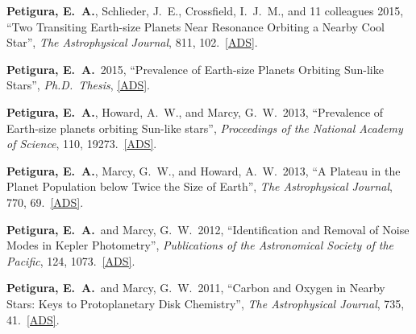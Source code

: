 \item {\bf {\bf Petigura, E.}~A.}, Schlieder, J.~E., Crossfield, I.~J.~M., and 11 
colleagues 2015,  ``Two Transiting Earth-size Planets Near Resonance 
Orbiting a Nearby Cool Star'', {\it The Astrophysical Journal}, 811,  102.\  
\href{http://adsabs.harvard.edu/abs/2015ApJ...811..102P}{[ADS]}. 


\item {\bf {\bf Petigura, E.}~A.}\ 2015,  ``Prevalence of Earth-size Planets Orbiting 
Sun-like Stars'', {\it Ph.D.~Thesis},   
\href{http://adsabs.harvard.edu/abs/2015PhDT........82P}{[ADS]}. 


\item {\bf {\bf Petigura, E.}~A.}, Howard, A.~W., and Marcy, G.~W.\ 2013,  ``Prevalence 
of Earth-size planets orbiting Sun-like stars'', {\it Proceedings of the 
National Academy of Science}, 110,  19273.\  
\href{http://adsabs.harvard.edu/abs/2013PNAS..11019273P}{[ADS]}. 


\item {\bf {\bf Petigura, E.}~A.}, Marcy, G.~W., and Howard, A.~W.\ 2013,  ``A Plateau 
in the Planet Population below Twice the Size of Earth'', {\it The 
Astrophysical Journal}, 770,  69.\  
\href{http://adsabs.harvard.edu/abs/2013ApJ...770...69P}{[ADS]}. 


\item {\bf {\bf Petigura, E.}~A.}~and Marcy, G.~W.\ 2012,  ``Identification and Removal 
of Noise Modes in Kepler Photometry'', {\it Publications of the 
Astronomical Society of the Pacific}, 124,  1073.\  
\href{http://adsabs.harvard.edu/abs/2012PASP..124.1073P}{[ADS]}. 


\item {\bf {\bf Petigura, E.}~A.}~and Marcy, G.~W.\ 2011,  ``Carbon and Oxygen in 
Nearby Stars: Keys to Protoplanetary Disk Chemistry'', {\it The 
Astrophysical Journal}, 735,  41.\  
\href{http://adsabs.harvard.edu/abs/2011ApJ...735...41P}{[ADS]}. 
\fi 
